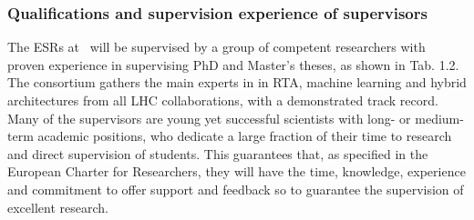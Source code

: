 

%




\subsubsection{Qualifications and supervision experience of supervisors}
\label{subsub:qual_supervisors}


The ESRs at \acronym\ will be supervised by a group of competent researchers with proven experience in supervising PhD and Master's theses, as shown in Tab. 1.2. 
The consortium gathers the main experts in in RTA, machine learning and hybrid architectures from all LHC collaborations, with a demonstrated track record. 
Many of the supervisors are young yet successful scientists with long- or medium-term academic positions, who dedicate a large fraction of their time to research and direct supervision of students. This guarantees that, as specified in the European Charter for Researchers, they will have the time, knowledge, experience and commitment to offer support and feedback so to guarantee the supervision of excellent research. 


